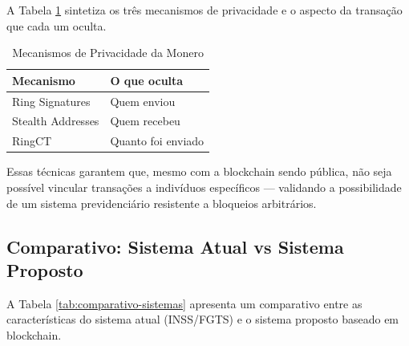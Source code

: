\begin{figure}[htb]
\end{figure}

A Tabela \ref{tab:mecanismos-privacidade} sintetiza os três mecanismos de privacidade e o aspecto da transação que cada um oculta.

\begin{table}[htb]
    \centering
    \caption{Mecanismos de Privacidade da Monero}
    \label{tab:mecanismos-privacidade}
    \begin{tabular}{ll}
        \toprule
        \textbf{Mecanismo} & \textbf{O que oculta} \\
        \midrule
        Ring Signatures & Quem enviou \\
        Stealth Addresses & Quem recebeu \\
        RingCT & Quanto foi enviado \\
        \bottomrule
    \end{tabular}
\end{table}

Essas técnicas garantem que, mesmo com a blockchain sendo pública, não seja possível vincular transações a indivíduos específicos --- validando a possibilidade de um sistema previdenciário resistente a bloqueios arbitrários.

\subsection{Comparativo: Sistema Atual vs Sistema Proposto}

A Tabela \ref{tab:comparativo-sistemas} apresenta um comparativo entre as características do sistema atual (INSS/FGTS) e o sistema proposto baseado em blockchain.

